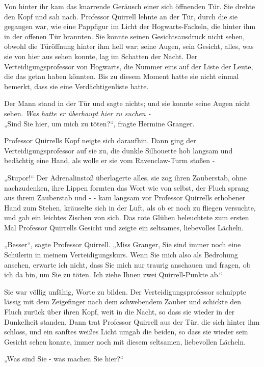 {Von hinter ihr kam das knarrende Geräusch einer sich öffnenden Tür. Sie drehte den Kopf und sah nach. Professor Quirrell lehnte an der Tür, durch die sie gegangen war, wie eine Pappfigur im Licht der Hogwarts-Fackeln, die hinter ihm in der offenen Tür brannten. Sie konnte seinen Gesichtsausdruck nicht sehen, obwohl die Türöffnung hinter ihm hell war; seine Augen, sein Gesicht, alles, was sie von hier aus sehen konnte, lag im Schatten der Nacht. Der Verteidigungsprofessor von Hogwarts, die Nummer eins auf der Liste der Leute, die das getan haben könnten. Bis zu diesem Moment hatte sie nicht einmal bemerkt, dass sie eine Verdächtigenliste hatte.

Der Mann stand in der Tür und sagte nichts; und sie konnte seine Augen nicht sehen. \emph{Was hatte er überhaupt hier zu suchen -}\\ „Sind Sie hier, um mich zu töten?“, fragte Hermine Granger.

Professor Quirrells Kopf neigte sich daraufhin. Dann ging der Verteidigungsprofessor auf sie zu, die dunkle Silhouette hob langsam und bedächtig eine Hand, als wolle er sie vom Ravenclaw-Turm stoßen -

„Stupor!“ Der Adrenalinstoß überlagerte alles, sie zog ihren Zauberstab, ohne nachzudenken, ihre Lippen formten das Wort wie von selbst, der Fluch sprang aus ihrem Zauberstab und - - kam langsam vor Professor Quirrells erhobener Hand zum Stehen, kräuselte sich in der Luft, als ob er noch zu fliegen versuchte, und gab ein leichtes Zischen von sich. Das rote Glühen beleuchtete zum ersten Mal Professor Quirrells Gesicht und zeigte ein seltsames, liebevolles Lächeln.

„Besser“, sagte Professor Quirrell. „Miss Granger, Sie sind immer noch eine Schülerin in meinem Verteidigungskurs. Wenn Sie mich also als Bedrohung ansehen, erwarte ich nicht, dass Sie mich nur traurig anschauen und fragen, ob ich da bin, um Sie zu töten. Ich ziehe Ihnen zwei Quirrell-Punkte ab.“

Sie war völlig unfähig, Worte zu bilden. Der Verteidigungsprofessor schnippte lässig mit dem Zeigefinger nach dem schwebendem Zauber und schickte den Fluch zurück über ihren Kopf, weit in die Nacht, so dass sie wieder in der Dunkelheit standen. Dann trat Professor Quirrell aus der Tür, die sich hinter ihm schloss, und ein sanftes weißes Licht umgab die beiden, so dass sie wieder sein Gesicht sehen konnte, immer noch mit diesem seltsamen, liebevollen Lächeln.

„Was sind Sie - was machen Sie hier?“

}
